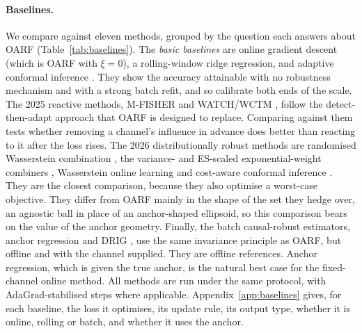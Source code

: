 \documentclass[11pt]{article}
\theoremstyle{plain}
\theoremstyle{remark}
\newcommand{\OARF}{\textsc{OARF}}
\begin{document}
\paragraph{Baselines.}
We compare against eleven methods, grouped by the question each answers about \OARF{}
(Table~\ref{tab:baselines}). The \emph{basic baselines} are online gradient descent
(which is \OARF{} with $\xi=0$), a rolling-window ridge regression, and adaptive
conformal inference \citep{gibbs2021aci}. They show the accuracy attainable with no
robustness mechanism and with a strong batch refit, and so calibrate both ends of the
scale. The 2025 reactive methods, M-FISHER \citep{mfisher2025} and WATCH/WCTM
\citep{watch2025}, follow the detect-then-adapt approach that \OARF{} is designed to
replace. Comparing against them tests whether removing a channel's influence in
advance does better than reacting to it after the loss rises. The 2026
distributionally robust methods are randomised Wasserstein combination
\citep{wang2026online}, the variance- and ES-scaled exponential-weight combiners
\citep{liu2026fcdro}, Wasserstein online learning \citep{chen2026wdro} and cost-aware
conformal inference \citep{costaci2026}. They are the closest comparison, because they
also optimise a worst-case objective. They differ from \OARF{} mainly in the shape of the set they hedge over, an agnostic ball in place of an anchor-shaped ellipsoid, so this comparison bears on the value of the anchor geometry. Finally, the batch
causal-robust estimators, anchor regression \citep{rothenhausler2021anchor} and DRIG
\citep{shen2023drig}, use the same invariance principle as \OARF{}, but offline and
with the channel supplied. They are offline references. Anchor regression, which is given the true anchor, is the natural best case for the fixed-channel online method. All methods are run under the same protocol, with
AdaGrad-stabilised steps where applicable. Appendix~\ref{app:baselines} gives, for
each baseline, the loss it optimises, its update rule, its output type, whether it is
online, rolling or batch, and whether it uses the anchor.
\end{document}
